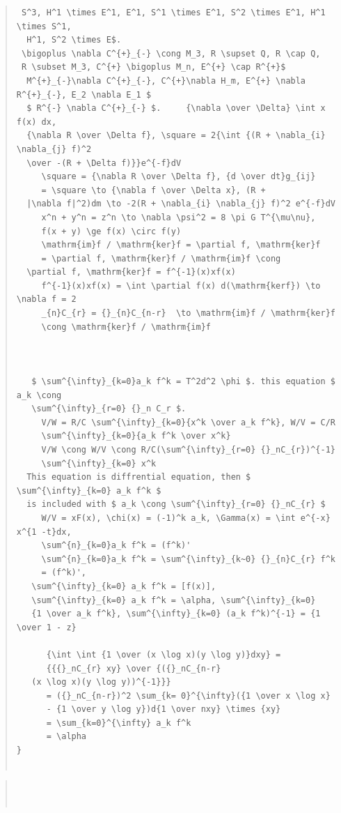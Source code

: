 \documentclass{jsarticle}
\begin{document}
{\begin{quote}
\begin{verbatim}
 S^3, H^1 \times E^1, E^1, S^1 \times E^1, S^2 \times E^1, H^1 \times S^1, 
  H^1, S^2 \times E$.  
 \bigoplus \nabla C^{+}_{-} \cong M_3, R \supset Q, R \cap Q, 
 R \subset M_3, C^{+} \bigoplus M_n, E^{+} \cap R^{+}$
  M^{+}_{-}\nabla C^{+}_{-}, C^{+}\nabla H_m, E^{+} \nabla R^{+}_{-}, E_2 \nabla E_1 $
  $ R^{-} \nabla C^{+}_{-} $.     {\nabla \over \Delta} \int x f(x) dx,
  {\nabla R \over \Delta f}, \square = 2{\int {(R + \nabla_{i} \nabla_{j} f)^2
  \over -(R + \Delta f)}}e^{-f}dV   
     \square = {\nabla R \over \Delta f}, {d \over dt}g_{ij} 
     = \square \to {\nabla f \over \Delta x}, (R + 
  |\nabla f|^2)dm \to -2(R + \nabla_{i} \nabla_{j} f)^2 e^{-f}dV   
     x^n + y^n = z^n \to \nabla \psi^2 = 8 \pi G T^{\mu\nu}, 
     f(x + y) \ge f(x) \circ f(y)   
     \mathrm{im}f / \mathrm{ker}f = \partial f, \mathrm{ker}f 
     = \partial f, \mathrm{ker}f / \mathrm{im}f \cong
  \partial f, \mathrm{ker}f = f^{-1}(x)xf(x)   
     f^{-1}(x)xf(x) = \int \partial f(x) d(\mathrm{kerf}) \to \nabla f = 2   
     _{n}C_{r} = {}_{n}C_{n-r}  \to \mathrm{im}f / \mathrm{ker}f 
     \cong \mathrm{ker}f / \mathrm{im}f   

  

   $ \sum^{\infty}_{k=0}a_k f^k = T^2d^2 \phi $. this equation $ a_k \cong 
   \sum^{\infty}_{r=0} {}_n C_r $.
     V/W = R/C \sum^{\infty}_{k=0}{x^k \over a_k f^k}, W/V = C/R
     \sum^{\infty}_{k=0}{a_k f^k \over x^k}   
     V/W \cong W/V \cong R/C(\sum^{\infty}_{r=0} {}_nC_{r})^{-1} 
     \sum^{\infty}_{k=0} x^k   
  This equation is diffrential equation, then $ \sum^{\infty}_{k=0} a_k f^k $
  is included with $ a_k \cong \sum^{\infty}_{r=0} {}_nC_{r} $
     W/V = xF(x), \chi(x) = (-1)^k a_k, \Gamma(x) = \int e^{-x} x^{1 -t}dx, 
     \sum^{n}_{k=0}a_k f^k = (f^k)'   
     \sum^{n}_{k=0}a_k f^k = \sum^{\infty}_{k~0} {}_{n}C_{r} f^k   
     = (f^k)', 
   \sum^{\infty}_{k=0} a_k f^k = [f(x)], 
   \sum^{\infty}_{k=0} a_k f^k = \alpha, \sum^{\infty}_{k=0} 
   {1 \over a_k f^k}, \sum^{\infty}_{k=0} (a_k f^k)^{-1} = {1 \over 1 - z}   

      {\int \int {1 \over (x \log x)(y \log y)}dxy} = 
      {{{}_nC_{r} xy} \over {({}_nC_{n-r} 
   (x \log x)(y \log y))^{-1}}}   
      = ({}_nC_{n-r})^2 \sum_{k= 0}^{\infty}({1 \over x \log x}
      - {1 \over y \log y})d{1 \over nxy} \times {xy}   
      = \sum_{k=0}^{\infty} a_k f^k   
      = \alpha   
}


\end{verbatim}
\end{quote}

\begin{quote}
\setlength{\baselineskip}{12pt}
\begin{verbatim}



\end{verbatim}
\end{quote}}
\end{document}
